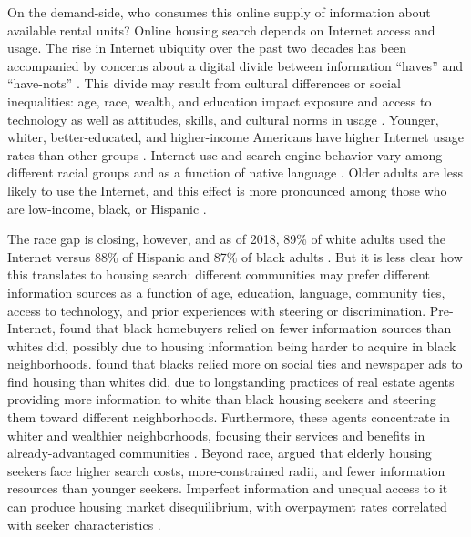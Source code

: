 \documentclass[11pt,letterpaper]{article}
\begin{document}
On the demand-side, who consumes this online supply of information about available rental units? Online housing search depends on Internet access and usage. The rise in Internet ubiquity over the past two decades has been accompanied by concerns about a digital divide between information \enquote{haves} and \enquote{have-nots} \citep{hersberger_are_2003,riddlesden_broadband_2014}. This divide may result from cultural differences or social inequalities: age, race, wealth, and education impact exposure and access to technology as well as attitudes, skills, and cultural norms in usage \citep{jones_u.s._2009,robinson_digital_2015}. Younger, whiter, better-educated, and higher-income Americans have higher Internet usage rates than other groups \citep{porter_using_2006}. Internet use and search engine behavior vary among different racial groups and as a function of native language \citep{slate_digital_2002,weber_who_2011}. Older adults are less likely to use the Internet, and this effect is more pronounced among those who are low-income, black, or Hispanic \citep{choi_digital_2013}.

The race gap is closing, however, and as of 2018, 89\% of white adults used the Internet versus 88\% of Hispanic and 87\% of black adults \citep{pew_research_center_internet_2018}. But it is less clear how this translates to housing search: different communities may prefer different information sources as a function of age, education, language, community ties, access to technology, and prior experiences with steering or discrimination. Pre-Internet, \citet{newburger_sources_1995} found that black homebuyers relied on fewer information sources than whites did, possibly due to housing information being harder to acquire in black neighborhoods. \citet{farley_racial_1996} found that blacks relied more on social ties and newspaper ads to find housing than whites did, due to longstanding practices of real estate agents providing more information to white than black housing seekers and steering them toward different neighborhoods. Furthermore, these agents concentrate in whiter and wealthier neighborhoods, focusing their services and benefits in already-advantaged communities \citep{besbris_investigating_2017}. Beyond race, \citet{deboer_resident_1985} argued that elderly housing seekers face higher search costs, more-constrained radii, and fewer information resources than younger seekers. Imperfect information and unequal access to it can produce housing market disequilibrium, with overpayment rates correlated with seeker characteristics \cite[cf.][]{desmond_poor_2019}.
\end{document}
